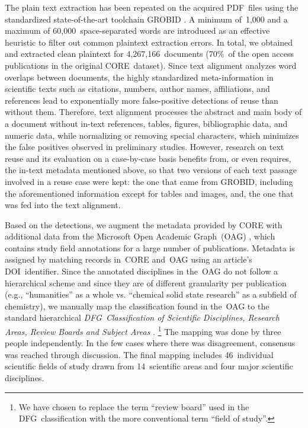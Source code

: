 The plain text extraction has been repeated on the acquired PDF~files using the standardized state-of-the-art toolchain GROBID \cite{lopez:2015}. A minimum of~1,000 and a maximum of 60,000~space-separated words are introduced as an effective heuristic to filter out common plaintext extraction errors. In total, we obtained and extracted clean plaintext for 4,267,166~documents (70\%~of the open access publications in the original CORE~dataset). Since text alignment analyzes word overlaps between documents, the highly standardized meta-information in scientific texts such as citations, numbers, author names, affiliations, and references lead to exponentially more false-positive detections of reuse than without them. Therefore, text alignment processes the abstract and main body of a document without in-text references, tables, figures, bibliographic data, and numeric data, while normalizing or removing special characters, which minimizes the false positives observed in preliminary studies. However, research on text reuse and its evaluation on a case-by-case basis benefits from, or even requires, the in-text metadata mentioned above, so that two versions of each text passage involved in a reuse case were kept: the one that came from GROBID, including the aforementioned information except for tables and images, and, the one that was fed into the text alignment.

Based on the detections, we augment the metadata provided by CORE with additional data from the Microsoft Open Academic Graph~(OAG) \cite{tang:2008,sinha:2015}, which contains study field annotations for a large number of publications. Metadata is assigned by matching records in~CORE and~OAG using an article's DOI~identifier. Since the annotated disciplines in the~OAG do not follow a hierarchical scheme and since they are of different granularity per publication (e.g., ``humanities'' as a whole vs. ``chemical solid state research'' as a subfield of chemistry), we manually map the classification found in the~OAG to the standard hierarchical \textit{DFG~Classification of Scientific Disciplines, Research Areas, Review Boards and Subject Areas} \cite{dfg:2016}.%
\footnote{We have chosen to replace the term ``review board'' used in the DFG~classification with the more conventional term ``field of study''.}
The mapping was done by three people independently. In the few cases where there was disagreement, consensus was reached through discussion. The final mapping includes 46~individual scientific fields of study drawn from 14~scientific areas and four major scientific disciplines.

